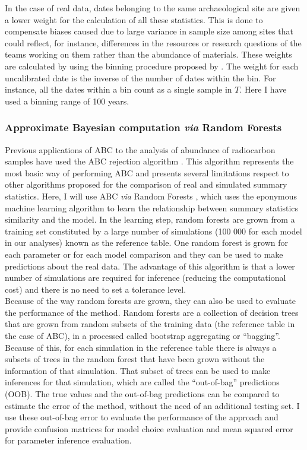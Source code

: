 \documentclass[a4paper]{article}
\begin{document}
In the case of real data, dates belonging to the same archaeological site are given a lower weight for the calculation of all these statistics. This is done to compensate biases caused due to large variance in sample size among sites that could reflect, for instance, differences in the resources or research questions of the teams working on them rather than the abundance of materials. These weights are calculated by using the binning procedure proposed by \textcite{Shennan2013}. The weight for each uncalibrated date is the inverse of the number of dates within the bin. For instance, all the dates within a bin count as a single sample in $T$. Here I have used a binning range of 100 years.
\\

\subsubsection*{Approximate Bayesian computation \emph{via} Random Forests}

Previous applications of ABC to the analysis of abundance of radiocarbon samples have used the ABC rejection algorithm \parencite{Porcic2020,DiNapoli2021}. This algorithm represents the most basic way of performing ABC and presents several limitations respect to other algorithms proposed for the comparison of real and simulated summary statistics. Here, I will use ABC \emph{via} Random Forests \parencite[ABCRF;][]{Pudlo2016, Raynal2019}, which uses the eponymous machine learning algorithm to learn the relationship between summary statistics similarity and the model. In the learning step, random forests are grown from a training set constituted by a large number of simulations (100 000 for each model in our analyses) known as the reference table. One random forest is grown for each parameter or for each model comparison and they can be used to make predictions about the real data. The advantage of this algorithm is that a lower number of simulations are required for inference (reducing the computational cost) and there is no need to set a tolerance level. 
\\

Because of the way random forests are grown, they can also be used to evaluate the performance of the method. Random forests are a collection of decision trees that are grown from random subsets of the training data (the reference table in the case of ABC), in a processed called bootstrap aggregating or ``bagging''. Because of this, for each simulation in the reference table there is always a subsets of trees in the random forest that have been grown without the information of that simulation. That subset of trees can be used to make inferences for that simulation, which are called the ``out-of-bag'' predictions (OOB). The true values and the out-of-bag predictions can be compared to estimate the error of the method, without the need of an additional testing set. I use these out-of-bag error to evaluate the performance of the approach and provide confusion matrices for model choice evaluation and mean squared error for parameter inference evaluation.
\\
\end{document}
